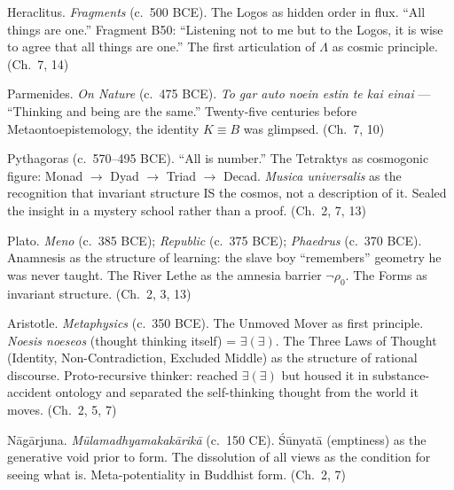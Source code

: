 \documentclass[10pt, openany, oneside]{book}
\renewcommand{\footnotesize}{\fontsize{8.5}{11}\selectfont}
\begin{document}
{\footnotesize

\noindent Heraclitus. \textit{Fragments} (c.\ 500 BCE). The Logos as hidden order in flux. ``All things are one.'' Fragment B50: ``Listening not to me but to the Logos, it is wise to agree that all things are one.'' The first articulation of $\Lambda$ as cosmic principle. (Ch.\ 7, 14)

\vspace{0.3em}

\noindent Parmenides. \textit{On Nature} (c.\ 475 BCE). \textit{To gar auto noein estin te kai einai} --- ``Thinking and being are the same.'' Twenty-five centuries before Metaontoepistemology, the identity $K \equiv B$ was glimpsed. (Ch.\ 7, 10)

\vspace{0.3em}

\noindent Pythagoras (c.\ 570--495 BCE). ``All is number.'' The Tetraktys as cosmogonic figure: Monad $\to$ Dyad $\to$ Triad $\to$ Decad. \textit{Musica universalis} as the recognition that invariant structure IS the cosmos, not a description of it. Sealed the insight in a mystery school rather than a proof. (Ch.\ 2, 7, 13)

\vspace{0.3em}

\noindent Plato. \textit{Meno} (c.\ 385 BCE); \textit{Republic} (c.\ 375 BCE); \textit{Phaedrus} (c.\ 370 BCE). Anamnesis as the structure of learning: the slave boy ``remembers'' geometry he was never taught. The River Lethe as the amnesia barrier $\neg\rho_0$. The Forms as invariant structure. (Ch.\ 2, 3, 13)

\vspace{0.3em}

\noindent Aristotle. \textit{Metaphysics} (c.\ 350 BCE). The Unmoved Mover as first principle. \textit{Noesis noeseos} (thought thinking itself) = $\exists(\exists)$. The Three Laws of Thought (Identity, Non-Contradiction, Excluded Middle) as the structure of rational discourse. Proto-recursive thinker: reached $\exists(\exists)$ but housed it in substance-accident ontology and separated the self-thinking thought from the world it moves. (Ch.\ 2, 5, 7)

\vspace{0.3em}

\noindent N\={a}g\={a}rjuna. \textit{M\={u}lamadhyamakak\={a}rik\={a}} (c.\ 150 CE). \'{S}\={u}nyat\={a} (emptiness) as the generative void prior to form. The dissolution of all views as the condition for seeing what is. Meta-potentiality in Buddhist form. (Ch.\ 2, 7)

}
\end{document}
